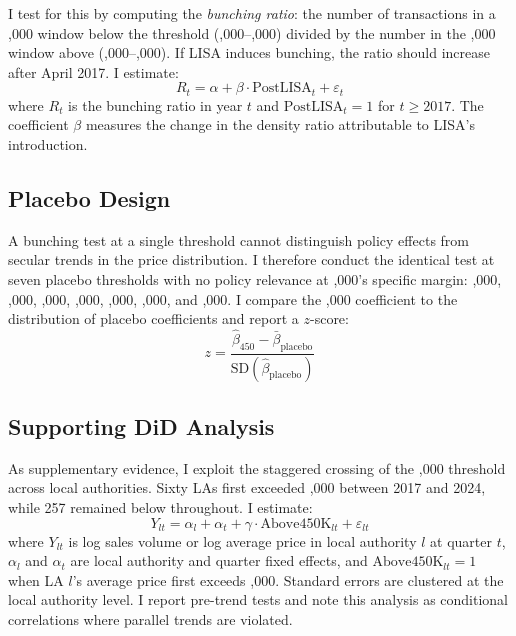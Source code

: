 \documentclass[12pt]{article}
\begin{document}
I test for this by computing the \textit{bunching ratio}: the number of transactions in a ,000 window below the threshold (,000--,000) divided by the number in the ,000 window above (,000--,000). If LISA induces bunching, the ratio should increase after April 2017. I estimate:
\begin{equation}
R_t = \alpha + \beta \cdot \text{PostLISA}_t + \varepsilon_t
\label{eq:bunching}
\end{equation}
where $R_t$ is the bunching ratio in year $t$ and $\text{PostLISA}_t = 1$ for $t \geq 2017$. The coefficient $\beta$ measures the change in the density ratio attributable to LISA's introduction.

\subsection{Placebo Design}

A bunching test at a single threshold cannot distinguish policy effects from secular trends in the price distribution. I therefore conduct the identical test at seven placebo thresholds with no policy relevance at ,000's specific margin: ,000, ,000, ,000, ,000, ,000, ,000, and ,000. I compare the ,000 coefficient to the distribution of placebo coefficients and report a $z$-score:
\begin{equation}
z = \frac{\hat{\beta}_{450} - \bar{\beta}_{\text{placebo}}}{\text{SD}(\hat{\beta}_{\text{placebo}})}
\end{equation}

\subsection{Supporting DiD Analysis}

As supplementary evidence, I exploit the staggered crossing of the ,000 threshold across local authorities. Sixty LAs first exceeded ,000 between 2017 and 2024, while 257 remained below throughout. I estimate:
\begin{equation}
Y_{lt} = \alpha_l + \alpha_t + \gamma \cdot \text{Above450K}_{lt} + \varepsilon_{lt}
\end{equation}
where $Y_{lt}$ is log sales volume or log average price in local authority $l$ at quarter $t$, $\alpha_l$ and $\alpha_t$ are local authority and quarter fixed effects, and $\text{Above450K}_{lt} = 1$ when LA $l$'s average price first exceeds ,000. Standard errors are clustered at the local authority level. I report pre-trend tests and note this analysis as conditional correlations where parallel trends are violated.
\end{document}
